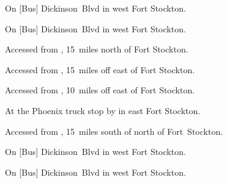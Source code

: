 

\begin{LocationList}

On [Bus] Dickinson~Blvd in west Fort Stockton.

\Location{\GarageHQ \Garage}
On [Bus] Dickinson~Blvd in west Fort Stockton.

Accessed from , 15~miles north of Fort Stockton.

Accessed from , 15~miles off  east of Fort Stockton.

Accessed from , 10~miles off  east of Fort Stockton.

At the Phoenix truck stop by   in east Fort Stockton.

Accessed from , 15~miles south of  north of Fort~Stockton.

On [Bus] Dickinson~Blvd in west Fort Stockton.

On [Bus] Dickinson~Blvd in west Fort Stockton.

\end{LocationList}
